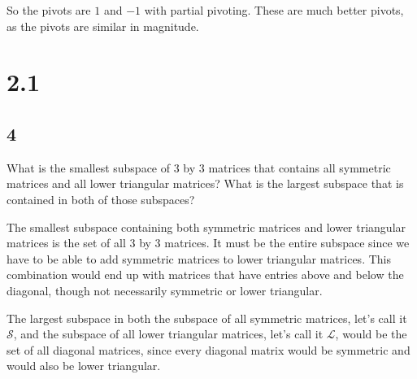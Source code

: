 \documentclass[12pt,letterpaper]{article}
\begin{document}
      So the pivots are $1$ and $-1$ with partial pivoting.
      These are much better pivots, as the pivots are similar in magnitude.

  \section*{2.1}
    \subsection*{4}
      What is the smallest subspace of 3 by 3 matrices that contains all symmetric matrices and all lower triangular matrices?
      What is the largest subspace that is contained in both of those subspaces?

      The smallest subspace containing both symmetric matrices and lower triangular matrices is the set of all 3 by 3 matrices.
      It must be the entire subspace since we have to be able to add symmetric matrices to lower triangular matrices. This combination would end up with matrices that have entries above and below the diagonal, though not necessarily symmetric or lower triangular.

      The largest subspace in both the subspace of all symmetric matrices, let's call it $\mathcal{S}$, and the subspace of all lower triangular matrices, let's call it $\mathcal{L}$, would be the set of all diagonal matrices, since every diagonal matrix would be symmetric and would also be lower triangular.
\end{document}
